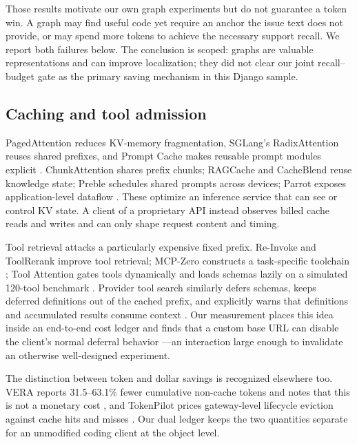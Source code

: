 \documentclass[10pt,twocolumn]{article}
\begin{document}
Those results motivate our own graph experiments but do not guarantee a token win.  A graph may find
useful code yet require an anchor the issue text does not provide, or may spend more tokens to achieve
the necessary support recall.  We report both failures below.  The conclusion is scoped: graphs are
valuable representations and can improve localization; they did not clear our joint recall--budget
gate as the primary saving mechanism in this Django sample.

\subsection{Caching and tool admission}

PagedAttention reduces KV-memory fragmentation, SGLang's RadixAttention reuses shared prefixes, and
Prompt Cache makes reusable prompt modules explicit \cite{kwon2023pagedattention,zheng2024sglang,
gim2024promptcache}.  ChunkAttention shares prefix chunks; RAGCache and CacheBlend reuse knowledge
state; Preble schedules shared prompts across devices; Parrot exposes application-level dataflow
\cite{ye2024chunkattention,jin2024ragcache,yao2025cacheblend,srivatsa2024preble,lin2024parrot}.
These optimize an inference service that can see or control KV state.  A client of a proprietary API
instead observes billed cache reads and writes and can only shape request content and timing.

Tool retrieval attacks a particularly expensive fixed prefix.  Re-Invoke and ToolRerank improve tool
retrieval; MCP-Zero constructs a task-specific toolchain \cite{chen2024reinvoke,zheng2024toolrerank,
fei2025mcpzero}; Tool Attention gates tools dynamically and loads schemas lazily on a simulated
120-tool benchmark \cite{sadani2026toolattention}.  Provider tool search similarly defers schemas,
keeps deferred definitions out of the cached prefix, and explicitly warns that definitions and
accumulated results consume context \cite{anthropicToolSearch,anthropicAdvancedTools,
anthropicToolContext}.  Our measurement places this idea inside an end-to-end cost ledger and finds that
a custom base URL can disable the client's normal deferral behavior \cite{anthropicMCP}---an interaction
large enough to invalidate an otherwise well-designed experiment.

The distinction between token and dollar savings is recognized elsewhere too.  VERA reports
31.5--63.1\% fewer cumulative non-cache tokens and notes that this is not a monetary cost
\cite{su2026vera}, and TokenPilot prices gateway-level lifecycle eviction against cache hits and misses
\cite{xu2026tokenpilot}.  Our dual ledger keeps the two quantities separate for an unmodified coding
client at the object level.
\end{document}
